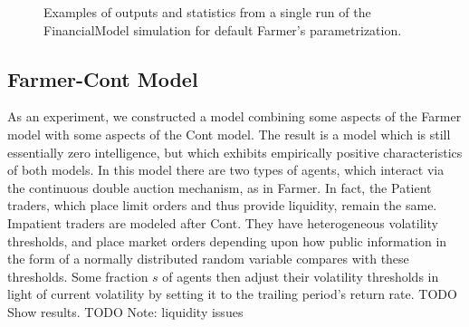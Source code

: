 \documentclass[runningheads]{llncs}
\begin{document}
\begin{figure}[htbp]
\begin{center}
{      
      }
    \caption{Examples of outputs and statistics from a single run of the FinancialModel simulation for default Farmer's parametrization.}
    \label{fig:sampleDynamicsFarmer}
  \end{center}
\end{figure}

\subsection{Farmer-Cont Model}

As an experiment, we constructed a model combining some aspects of the Farmer model with some aspects of the Cont model. The result is a model which is still essentially zero intelligence, but which exhibits empirically positive characteristics of both models. In this model there are two types of agents, which interact via the continuous double auction mechanism, as in Farmer. In fact, the Patient traders, which place limit orders and thus provide liquidity, remain the same. Impatient traders are modeled after Cont. They have heterogeneous volatility thresholds, and place market orders depending upon how public information in the form of a normally distributed random variable compares with these thresholds. Some fraction $s$ of agents then adjust their volatility thresholds in light of current volatility by setting it to the trailing period's return rate.
TODO Show results.
TODO Note: liquidity issues
\end{document}
